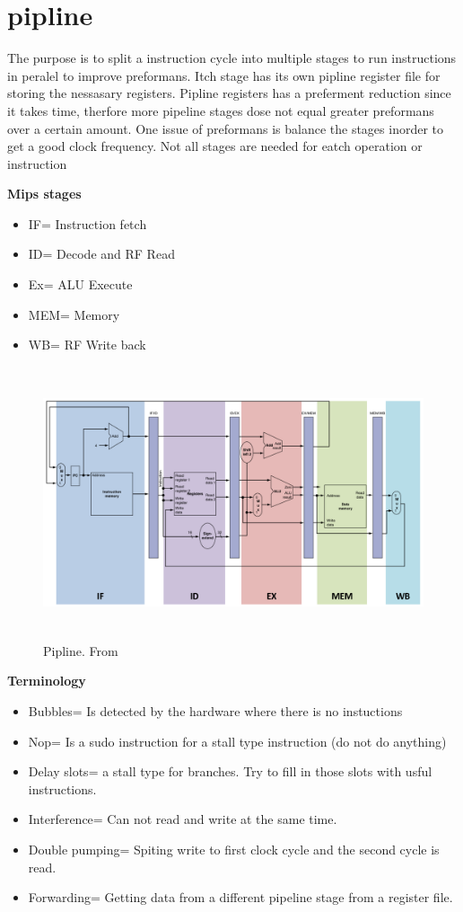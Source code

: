 \newpage


\section{pipline}
The purpose is to split a instruction cycle into multiple stages to run instructions in peralel to
improve preformans. Itch stage has its own pipline register file for storing the nessasary registers.
Pipline registers has a preferment reduction since it takes time, therfore more pipeline stages dose
not equal greater preformans over a certain amount. One issue of preformans is balance the stages
inorder to get a good clock frequency. 
Not all stages are needed for eatch operation or instruction

\textbf{Mips stages}
\begin{itemize}
\item  IF= Instruction fetch
\item  ID= Decode and RF Read
\item  Ex= ALU Execute
\item  MEM= Memory
\item  WB= RF Write back
\end{itemize}

\begin{figure}[h]
    \vspace{10mm}
    \centering
    \includegraphics[width=16cm, height=8cm]{image/pipline.png} 
    \caption{Pipline. From \cite{}}
    \label{pipline}
\end{figure}

\newpage

\textbf{Terminology}
\begin{itemize}
\item  Bubbles= Is detected by the hardware where there is no instuctions
\item  Nop= Is a sudo instruction for a stall type instruction (do not do anything)
\item  Delay slots= a stall type for branches. Try to fill in those slots with usful instructions.
\item  Interference= Can not read and write at the same time.
\item  Double pumping= Spiting write to first clock cycle and the second cycle is read.
\item  Forwarding= Getting data from a different pipeline stage from a register file.
\end{itemize}


